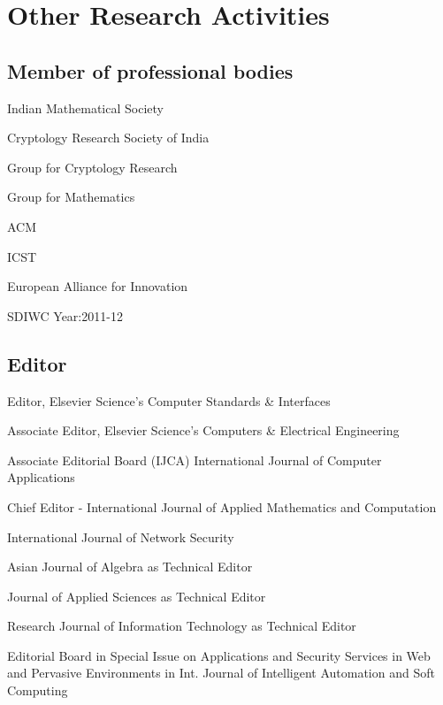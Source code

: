 \documentclass[letterpaper]{article}
\renewenvironment{itemize}{
  \begin{list}{}{
    \setlength{\leftmargin}{1.5em}
  }
}{
  \end{list}
}
\begin{document}
\section*{Other Research Activities}
\subsection*{Member of professional bodies }
\begin{itemize}
\item Indian Mathematical Society
\item Cryptology Research Society of India
\item Group for Cryptology Research
\item Group for Mathematics 
\item ACM  
\item ICST
\item European Alliance for Innovation
\item SDIWC Year:2011-12

\end{itemize}

\subsection*{Editor}
\begin{itemize}
\item Editor, Elsevier Science's Computer Standards \& Interfaces
\item Associate Editor, Elsevier Science's Computers \& Electrical Engineering 
\item Associate Editorial Board (IJCA) International Journal of Computer Applications 
\item Chief Editor - International Journal of Applied Mathematics and Computation 
\item International Journal of Network Security  
\item Asian Journal of Algebra as Technical Editor
\item Journal of Applied Sciences as Technical Editor
\item Research Journal of Information Technology as Technical Editor
\item Editorial Board in Special Issue on Applications and Security Services in Web and Pervasive Environments in Int. Journal of Intelligent Automation and Soft Computing
\end{itemize}
\end{document}
